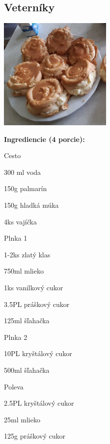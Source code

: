\setcounter{step}{0}

\subsection{ Veterníky }

\begin{ingredient}
  
      \includegraphics[height=5.5cm]{images/veterniky}
  
  \def\portions{  }
  \textbf{ {\normalsize Ingrediencie (4 porcie):} }

  \begin{main}
      \item 
  \end{main}
  
    \begin{subingredient}{Cesto}
        \item 300 ml voda
        \item 150g palmarín
        \item 150g hladká múka
        \item 4ks vajíčka
    \end{subingredient}
  
    \begin{subingredient}{Plnka 1}
        \item 1-2ks zlatý klas
        \item 750ml mlieko
        \item 1ks vanilkový cukor
        \item 3.5PL práškový cukor
        \item 125ml šľahačka
    \end{subingredient}
  
    \begin{subingredient}{Plnka 2}
        \item 10PL kryštálový cukor
        \item 500ml šľahačka
    \end{subingredient}
  
    \begin{subingredient}{Poleva}
        \item 2.5PL kryštálový cukor
        \item 25ml mlieko
        \item 125g práškový cukor
    \end{subingredient}
  
\end{ingredient}
